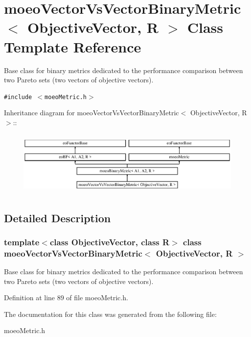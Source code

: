 \section{moeo\-Vector\-Vs\-Vector\-Binary\-Metric$<$ Objective\-Vector, R $>$ Class Template Reference}
\label{classmoeoVectorVsVectorBinaryMetric}
Base class for binary metrics dedicated to the performance comparison between two Pareto sets (two vectors of objective vectors).  


{\tt \#include $<$moeo\-Metric.h$>$}

Inheritance diagram for moeo\-Vector\-Vs\-Vector\-Binary\-Metric$<$ Objective\-Vector, R $>$::\begin{figure}[H]
\begin{center}
\leavevmode
\includegraphics[height=3.22767cm]{classmoeoVectorVsVectorBinaryMetric}
\end{center}
\end{figure}


\subsection{Detailed Description}
\subsubsection*{template$<$class Objective\-Vector, class R$>$ class moeo\-Vector\-Vs\-Vector\-Binary\-Metric$<$ Objective\-Vector, R $>$}

Base class for binary metrics dedicated to the performance comparison between two Pareto sets (two vectors of objective vectors). 



Definition at line 89 of file moeo\-Metric.h.

The documentation for this class was generated from the following file:\begin{CompactItemize}
\item 
moeo\-Metric.h\end{CompactItemize}
